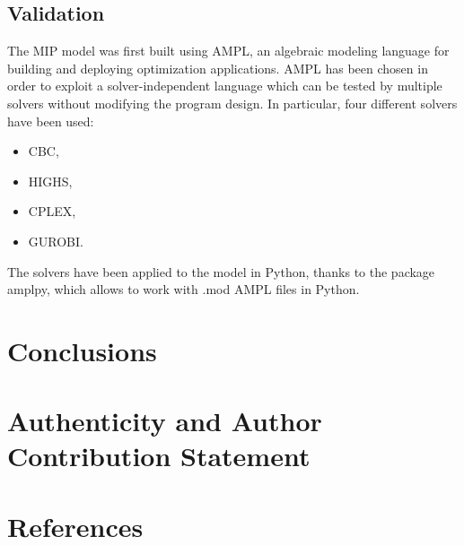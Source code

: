 \documentclass{article}
\begin{document}
\subsection{Validation}
The MIP model was first built using AMPL, an algebraic modeling language for building and deploying optimization applications. AMPL has been chosen in order to exploit a solver-independent language which can be tested by multiple solvers without modifying the program design. In particular, four different solvers have been used:

\begin{itemize}
    \item CBC,
    \item HIGHS,
    \item CPLEX, 
    \item GUROBI.
\end{itemize}

The solvers have been applied to the model in Python, thanks to the package amplpy, which allows to work with .mod AMPL files in Python.

\section{Conclusions}

\section{Authenticity and Author Contribution Statement}

\section{References}
\end{document}
